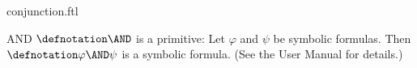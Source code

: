 \documentclass{stex}
\begin{document}
\begin{smodule}{conjunction.ftl}


\begin{documentation}{AND}
  $\defnotation\AND$ is a \Naproche primitive:
  Let $\varphi$ and $\psi$ be symbolic formulas.
  Then $\defnotation\varphi\AND\psi$ is a symbolic formula.
  (See the \Naproche User Manual for details.)
\end{documentation}

\end{smodule}
\end{document}
